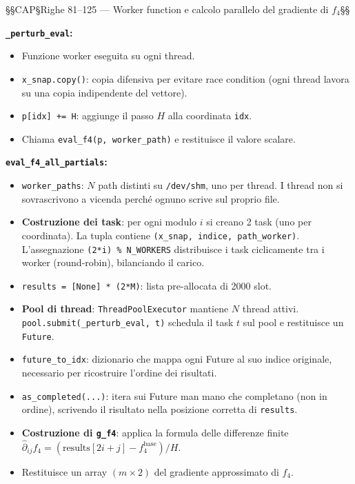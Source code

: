 \documentclass[12pt,a4paper]{article}
\theoremstyle{definition}
\begin{document}
§§CAP§Righe 81–125 — Worker function e calcolo parallelo del gradiente di $f_4$§§



\textbf{\texttt{\_perturb\_eval}:}
\begin{itemize}[nosep]
  \item Funzione worker eseguita su ogni thread.
  \item \texttt{x\_snap.copy()}: copia difensiva per evitare race condition (ogni thread lavora
        su una copia indipendente del vettore).
  \item \texttt{p[idx] += H}: aggiunge il passo $H$ alla coordinata \texttt{idx}.
  \item Chiama \texttt{eval\_f4(p, worker\_path)} e restituisce il valore scalare.
\end{itemize}

\textbf{\texttt{eval\_f4\_all\_partials}:}
\begin{itemize}[nosep]
  \item \texttt{worker\_paths}: $N$ path distinti su \texttt{/dev/shm}, uno per thread.
        I thread non si sovrascrivono a vicenda perché ognuno scrive sul proprio file.
  \item \textbf{Costruzione dei task}: per ogni modulo $i$ si creano 2 task (uno per
        coordinata). La tupla contiene \texttt{(x\_snap, indice, path\_worker)}.
        L'assegnazione \texttt{(2*i) \% N\_WORKERS} distribuisce i task ciclicamente tra
        i worker (round-robin), bilanciando il carico.
  \item \texttt{results = [None] * (2*M)}: lista pre-allocata di 2000 slot.
  \item \textbf{Pool di thread}: \texttt{ThreadPoolExecutor} mantiene $N$ thread attivi.
        \texttt{pool.submit(\_perturb\_eval, t)} schedula il task $t$ sul pool e restituisce
        un \texttt{Future}.
  \item \texttt{future\_to\_idx}: dizionario che mappa ogni Future al suo indice originale,
        necessario per ricostruire l'ordine dei risultati.
  \item \texttt{as\_completed(...)}: itera sui Future man mano che completano (non in ordine),
        scrivendo il risultato nella posizione corretta di \texttt{results}.
  \item \textbf{Costruzione di \texttt{g\_f4}}: applica la formula delle differenze finite
        $\hat{\partial}_{ij} f_4 = (\text{results}[2i+j] - f_4^{\text{base}}) / H$.
  \item Restituisce un array $(m \times 2)$ del gradiente approssimato di $f_4$.
\end{itemize}
\end{document}
